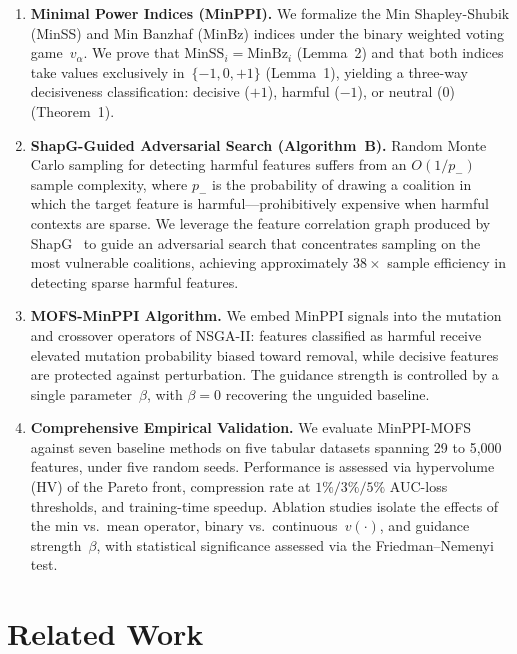 \documentclass{article} %
\begin{document}
\begin{enumerate}
\item {\bf Minimal Power Indices (MinPPI).} We formalize the Min Shapley-Shubik (MinSS) and Min Banzhaf (MinBz) indices under the binary weighted voting game~$v_\alpha$. We prove that $\text{MinSS}_i = \text{MinBz}_i$ (Lemma~2) and that both indices take values exclusively in~$\{-1, 0, +1\}$ (Lemma~1), yielding a three-way decisiveness classification: decisive ($+1$), harmful ($-1$), or neutral ($0$) (Theorem~1).

\item {\bf ShapG-Guided Adversarial Search (Algorithm~B).} Random Monte Carlo sampling for detecting harmful features suffers from an $O(1/p_-)$ sample complexity, where $p_-$ is the probability of drawing a coalition in which the target feature is harmful---prohibitively expensive when harmful contexts are sparse. We leverage the feature correlation graph produced by ShapG~\citep{zhao2025shapg} to guide an adversarial search that concentrates sampling on the most vulnerable coalitions, achieving approximately $38\times$ sample efficiency in detecting sparse harmful features.

\item {\bf MOFS-MinPPI Algorithm.} We embed MinPPI signals into the mutation and crossover operators of NSGA-II: features classified as harmful receive elevated mutation probability biased toward removal, while decisive features are protected against perturbation. The guidance strength is controlled by a single parameter~$\beta$, with $\beta = 0$ recovering the unguided baseline.

\item {\bf Comprehensive Empirical Validation.} We evaluate MinPPI-MOFS against seven baseline methods on five tabular datasets spanning 29 to 5{,}000 features, under five random seeds. Performance is assessed via hypervolume (HV) of the Pareto front, compression rate at $1\%/3\%/5\%$ AUC-loss thresholds, and training-time speedup. Ablation studies isolate the effects of the min vs.\ mean operator, binary vs.\ continuous~$v(\cdot)$, and guidance strength~$\beta$, with statistical significance assessed via the Friedman--Nemenyi test.
\end{enumerate}

\section{Related Work}
\label{sec:related}
\end{document}
